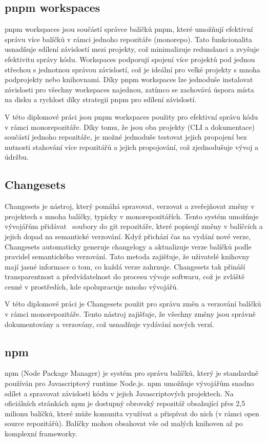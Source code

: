 \subsection{pnpm workspaces}
pnpm workspaces jsou součástí správce balíčků pnpm, které umožňují efektivní správu více balíčků v rámci jednoho repozitáře (monorepo). Tato funkcionalita usnadňuje sdílení závislostí mezi projekty, což minimalizuje redundanci a zvyšuje efektivitu správy kódu. Workspaces podporují spojení více projektů pod jednou střechou s jednotnou správou závislostí, což je ideální pro velké projekty s mnoha podprojekty nebo knihovnami. Díky pnpm workspaces lze jednoduše instalovat závislosti pro všechny workspaces najednou, zatímco se zachovává úspora místa na disku a rychlost díky strategii pnpm pro sdílení závislostí. \cite{PnpmWorkspaces}

V této diplomové práci jsou pnpm workspaces použity pro efektivní správu kódu v rámci monorepozitáře. Díky tomu, že jsou oba projekty (CLI a dokumentace) součástí jednoho repozitáře, je možné jednoduše testovat jejich propojení bez nutnosti stahování více repozitářů a jejich propojování, což zjednodušuje vývoj a údržbu.


\subsection{Changesets}
Changesets je nástroj, který pomáhá spravovat, verzovat a zveřejňovat změny v projektech s mnoha balíčky, typicky v monorepozitářích. Tento systém umožňuje vývojářům přidávat ~soubory do git repozitáře, které popisují změny v balíčcích a jejich dopad na semantické verzování. Když přichází čas na vydání nové verze, Changesets automaticky generuje changelogy a aktualizuje verze balíčků podle pravidel semantického verzování. Tato metoda zajišťuje, že uživatelé knihovny mají jasné informace o tom, co každá verze zahrnuje. Changesets tak přináší transparentnost a předvídatelnost do procesu vývoje softwaru, což je zvláště cenné v prostředích, kde spolupracuje mnoho vývojářů. \cite{Changesets}

V této diplomové práci je Changesets použit pro správu změn a verzování balíčků v rámci monorepozitáře. Tento nástroj zajišťuje, že všechny změny jsou správně dokumentovány a verzovány, což usnadňuje vydávání nových verzí.

\subsection{npm}
npm (Node Package Manager) je systém pro správu balíčků, který je standardně používán pro Javascriptový runtime Node.js. npm umožňuje vývojářům snadno sdílet a spravovat závislosti kódu v jejich Javascriptových projektech. Na oficiálních stránkách npm je dostupný obrovský repozitář obsahující přes 2,5 milionu balíčků, které může komunita využívat a přispívat do nich (v rámci open source repozitářů). Balíčky mohou obsahovat vše od malých knihoven až po komplexní frameworky. \cite{Npm}

